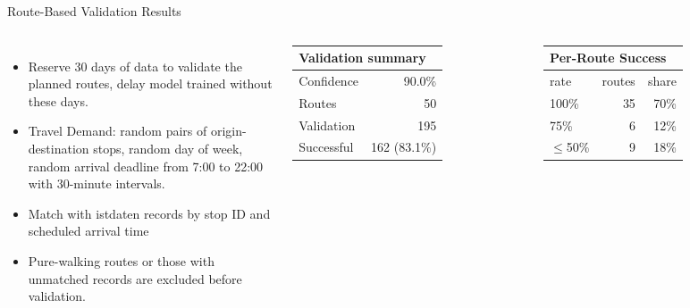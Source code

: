 \documentclass[aspectratio=169,11pt]{beamer}
\begin{document}
\begin{frame}{Route-Based Validation Results}
  \begin{columns}[T,onlytextwidth]
  
    \vspace{3mm}
      \begin{itemize}
        \item Reserve 30 days of data to validate the planned routes, delay model trained without these days.
        \item Travel Demand: random pairs of origin-destination stops, random day of week, random arrival deadline from 7:00 to 22:00 with 30-minute intervals.
        \item Match with istdaten records by stop ID and scheduled arrival time
        \item Pure-walking routes or those with unmatched records are excluded before validation.
      \end{itemize}

      \centering
      \begin{tabular}{lr}
        \multicolumn{2}{l}{\bfseries Validation summary}\\[1mm]
        \toprule
        Confidence & 90.0\%\\
        Routes & 50\\
        Validation & 195\\
        Successful & 162 (83.1\%)\\
        \bottomrule
      \end{tabular}

      \vspace{3mm}
      \begin{tabular}{lrr}
        \multicolumn{3}{l}{\bfseries Per-Route Success}\\[1mm]
        \toprule
        rate & routes & share\\
        \midrule
        100\% & 35 & 70\%\\
        75\% & 6 & 12\%\\
        $\leq$50\% & 9 & 18\%\\
        \bottomrule
      \end{tabular}
  \end{columns}
\end{frame}
\end{document}
